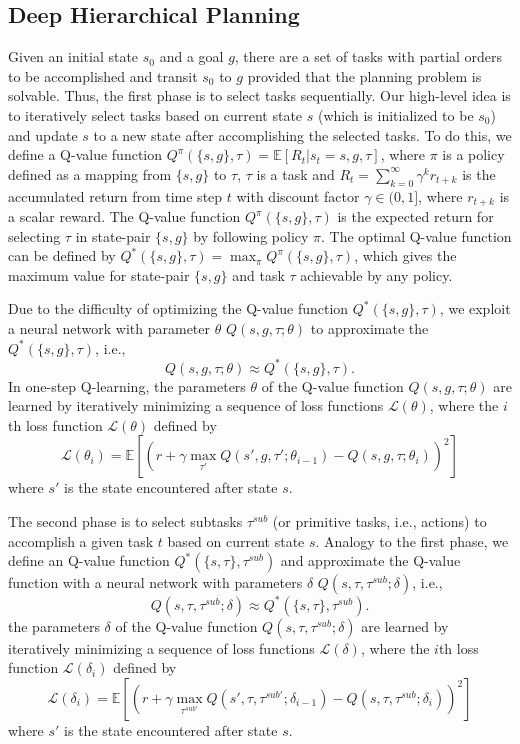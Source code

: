 \documentclass[letterpaper]{article}
\begin{document}
\subsection{Deep Hierarchical Planning}
Given an initial state $s_0$ and a goal $g$, there are a set of tasks with partial orders to be accomplished and transit $s_0$ to $g$ provided that the planning problem is solvable. Thus, the first phase is to select tasks sequentially. Our high-level idea is to iteratively select tasks based on current state $s$ (which is initialized to be $s_0$) and update $s$ to a new state after accomplishing the selected tasks. To do this, we define a Q-value function $Q^{\pi}(\{s,g\},\tau)=\mathbb{E}[R_t|s_t=s,g,\tau]$, where $\pi$ is a policy defined as a mapping from $\{s,g\}$ to $\tau$, $\tau$ is a task and $R_t=\sum_{k=0}^{\infty}\gamma^kr_{t+k}$ is the accumulated return from time step $t$ with discount factor $\gamma\in(0,1]$, where $r_{t+k}$ is a scalar reward. The Q-value function $Q^{\pi}(\{s,g\},\tau)$ is the expected return for selecting $\tau$ in state-pair $\{s,g\}$ by following policy $\pi$. The optimal Q-value function can be defined by $Q^*(\{s,g\},\tau)=\max_{\pi}Q^{\pi}(\{s,g\},\tau)$, which gives the maximum value for state-pair $\{s,g\}$ and task $\tau$ achievable by any policy.

Due to the difficulty of optimizing the Q-value function $Q^*(\{s,g\},\tau)$, we exploit a neural network with parameter $\theta$ $Q(s,g,\tau;\theta)$ to approximate the $Q^*(\{s,g\},\tau)$, i.e., \[Q(s,g,\tau;\theta)\approx Q^*(\{s,g\},\tau).\]
In one-step Q-learning, the parameters $\theta$ of the Q-value function $Q(s,g,\tau;\theta)$ are learned by iteratively minimizing a sequence of loss functions $\mathcal{L}(\theta)$, where the $i$th loss function $\mathcal{L}(\theta)$ defined by
\begin{equation}\label{DeepRL2}
\mathcal{L}(\theta_i)=\mathbb{E}[(r+\gamma\max_{\tau'}Q(s',g,\tau';\theta_{i-1})-Q(s,g,\tau;\theta_i))^2]
\end{equation}
where $s'$ is the state encountered after state $s$.

The second phase is to select subtasks $\tau^{sub}$ (or primitive tasks, i.e., actions) to accomplish a given task $t$ based on current state $s$. Analogy to the first phase, we define an Q-value function $Q^*(\{s,\tau\},\tau^{sub})$ and approximate the Q-value function with a neural network with parameters $\delta$ $Q(s,\tau,\tau^{sub};\delta)$, i.e., 
\[Q(s,\tau,\tau^{sub};\delta) \approx Q^*(\{s,\tau\},\tau^{sub}).\]
the parameters $\delta$ of the Q-value function $Q(s,\tau,\tau^{sub};\delta)$ are learned by iteratively minimizing a sequence of loss functions $\mathcal{L}(\delta)$, where the $i$th loss function $\mathcal{L}(\delta_i)$ defined by
\begin{equation}\label{DeepRL3}
\mathcal{L}(\delta_i)=\mathbb{E}[(r+\gamma\max_{\tau^{sub'}}Q(s',\tau,\tau^{sub'};\delta_{i-1})-Q(s,\tau,\tau^{sub};\delta_i))^2]
\end{equation}
where $s'$ is the state encountered after state $s$.
\end{document}
